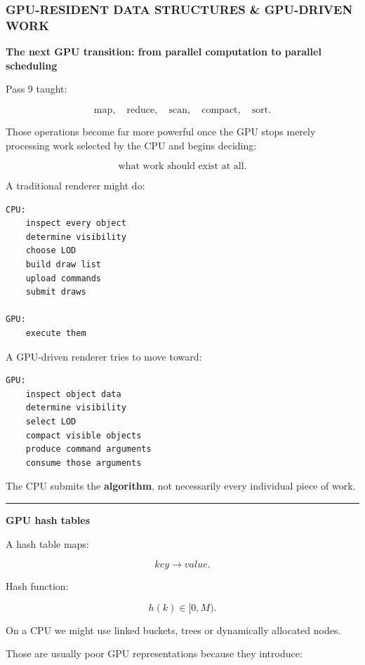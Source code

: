 \subsubsection{GPU-RESIDENT DATA STRUCTURES \& GPU-DRIVEN WORK}\label{05-engine-i-ch019-gpu-resident-data-structures-gpu-driven-work}

\textbf{The next GPU transition: from parallel computation to parallel scheduling}

Pass 9 taught:

\[
\text{map},
\quad
\text{reduce},
\quad
\text{scan},
\quad
\text{compact},
\quad
\text{sort}.
\]

Those operations become far more powerful once the GPU stops merely processing work selected by the CPU and begins deciding:

\[
\boxed{
\text{what work should exist at all}.
}
\]

A traditional renderer might do:

\protect{}\label{p10-cpu-driven}%
\begin{verbatim}
CPU:
    inspect every object
    determine visibility
    choose LOD
    build draw list
    upload commands
    submit draws

GPU:
    execute them
\end{verbatim}

A GPU-driven renderer tries to move toward:

\protect{}\label{p10-gpu-driven}%
\begin{verbatim}
GPU:
    inspect object data
    determine visibility
    select LOD
    compact visible objects
    produce command arguments
    consume those arguments
\end{verbatim}

The CPU submits the \textbf{algorithm}, not necessarily every individual piece of work.

\begin{center}\rule{0.5\linewidth}{0.5pt}\end{center}

\textbf{GPU hash tables}

A hash table maps:

\[
key\rightarrow value.
\]

Hash function:

\[
h(k)\in[0,M).
\]

On a CPU we might use linked buckets, trees or dynamically allocated nodes.

Those are usually poor GPU representations because they introduce:

